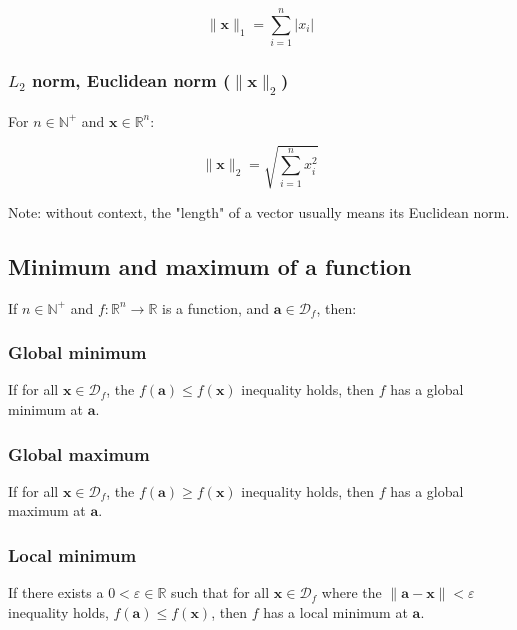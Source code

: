 \documentclass{article}
\begin{document}
          $$\| \mathbf{x} \|_1 = \sum_{i=1}^n \left\lvert x_i \right\rvert$$

        \subsubsection{$L_2$ norm, Euclidean norm ($\| \mathbf{x} \|_2$)}

          For $n \in \mathbb{N}^+$ and $\mathbf{x} \in \mathbb{R}^n$:

          $$\| \mathbf{x} \|_2 = \sqrt{ \sum_{i=1}^n x_i^2 }$$

          Note: without context, the "length" of a vector usually means its
          Euclidean norm.

      \subsection{Minimum and maximum of a function}

        If $n \in \mathbb{N}^+$ and $f : \mathbb{R}^n \rightarrow \mathbb{R}$ is
        a function, and $\mathbf{a} \in \mathcal{D}_f$, then:

        \subsubsection{Global minimum}

          If for all $\mathbf{x} \in \mathcal{D}_f$, the
          $f(\mathbf{a}) \leq f(\mathbf{x})$ inequality holds, then $f$ has a
          global minimum at $\mathbf{a}$.

        \subsubsection{Global maximum}

          If for all $\mathbf{x} \in \mathcal{D}_f$, the
          $f(\mathbf{a}) \geq f(\mathbf{x})$ inequality holds, then $f$ has a
          global maximum at $\mathbf{a}$.

        \subsubsection{Local minimum}

          If there exists a $0 < \varepsilon \in \mathbb{R}$ such that for all
          $\mathbf{x} \in \mathcal{D}_f$ where the
          $\| \mathbf{a} - \mathbf{x} \| < \varepsilon$ inequality holds,
          $f(\mathbf{a}) \leq f(\mathbf{x})$, then $f$ has a local minimum at
          $\mathbf{a}$.
\end{document}
